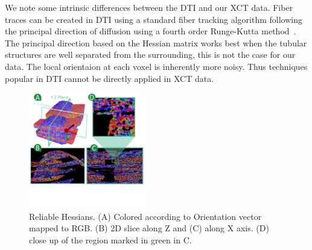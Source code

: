  
We note some intrinsic differences between the DTI and our XCT data. Fiber traces can be created in DTI using a standard fiber tracking algorithm following the principal direction of diffusion using a fourth order Runge-Kutta method~\cite{Brun2003}. The principal direction based on the Hessian matrix works best when the tubular structures are well separated from the surrounding, this is not the case for our data. The local orientaion at each voxel is inherently more noisy. Thus techniques popular in DTI cannot be directly applied in XCT data.

%
\begin{figure}[tb]
\centering
\includegraphics[width=0.45\textwidth,  trim = 0mm 90mm 0mm 0mm, clip]{imagesMT2014/image2B.pdf}
\caption{Reliable Hessians. (A) Colored according to Orientation vector mapped to RGB. (B) 2D slice along Z and (C) along X axis. (D) close up of the region marked in green in C.}
\label{fig:reliable_hessian}
\end{figure}



